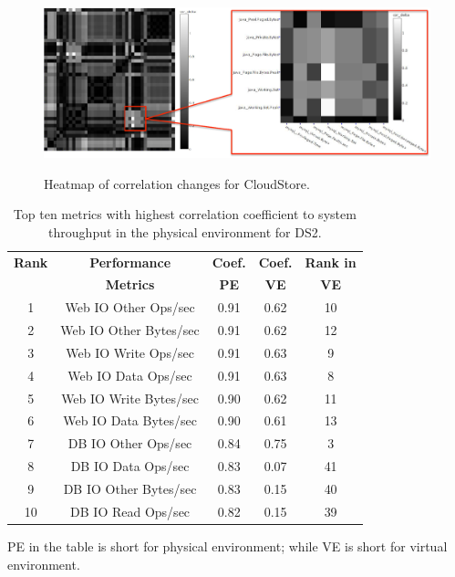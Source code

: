 \begin{figure}[tbh]
	\centering
	{\includegraphics[width=1.0\textwidth]{figures/cloudstore_heat-cropped}}
	\caption{Heatmap of correlation changes for CloudStore.}
	\label{fig:heatmap_cs}
\end{figure}





\begin{table}[tbh]
	\centering
	\caption{Top ten metrics with highest correlation coefficient to system throughput in the physical environment for DS2. }
	\label{tab:top10ds2p}
	\begin{threeparttable}
	
		\begin{tabular}{|c||c|c|c|c|}
			\hline
			\textbf{Rank} & \textbf{Performance } & \textbf{Coef. } & \textbf{Coef. } & \textbf{Rank in} \\ %
			 & \textbf{ Metrics} & \textbf{PE} & \textbf{VE} & \textbf{VE} \\ %
			\midrule
			\midrule
			1 & Web IO Other Ops/sec & 0.91 & 0.62 & 10 \\ \hline
			2 & Web IO Other Bytes/sec & 0.91 & 0.62 & 12 \\ \hline
			3 & Web IO Write Ops/sec & 0.91 & 0.63 & 9 \\ \hline
			4 & Web IO Data Ops/sec & 0.91 & 0.63 & 8 \\ \hline
			5 & Web IO Write Bytes/sec & 0.90 & 0.62 & 11 \\ \hline
			6 & Web IO Data Bytes/sec & 0.90 & 0.61 & 13 \\ \hline
			7 & DB IO Other Ops/sec & 0.84 & 0.75 & 3 \\ \hline
			8 & DB IO Data Ops/sec & 0.83 & 0.07 & 41 \\ \hline
			9 & DB IO Other Bytes/sec & 0.83 & 0.15 & 40 \\ \hline
			10 & DB IO Read Ops/sec & 0.82 & 0.15 & 39 \\ \hline
		\end{tabular}%
		\begin{tablenotes}
			\item PE in the table is short for physical environment; while VE is short for virtual environment.
		\end{tablenotes}
		\end{threeparttable}
	
	
\end{table}

